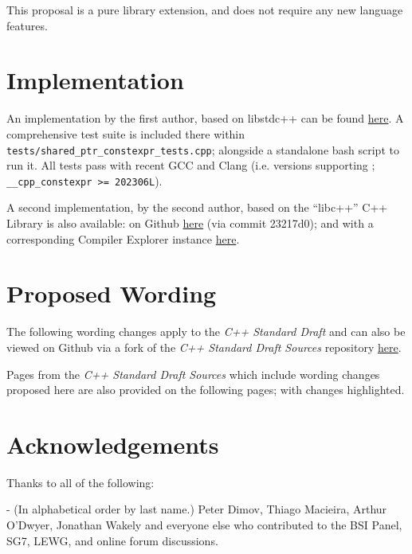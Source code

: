 \documentclass[10pt]{article}
\newcommand*{\upstreamcommit}{4dd513d}
\newcommand*{\forkcommit}{4b5d3cf}
\begin{document}
This proposal is a pure library extension, and does not require any new
language features.

\section{Implementation}

An implementation by the first author, based on libstdc++
can be found \href{https://github.com/SCT4SP/constexpr_shared_ptr}{here}. A
comprehensive test suite is included there within
\texttt{tests/shared\_ptr\_constexpr\_tests.cpp}; alongside a standalone bash
script to run it. All tests pass with recent GCC and Clang (i.e. versions
supporting \cite{P2738R1}; \texttt{\_\_cpp\_constexpr >= 202306L}).

A second implementation, by the second author, based on the ``libc++'' C++
Library is also available: on Github
\href{https://github.com/hanickadot/llvm-project/tree/P3309-constexpr-atomic-and-atomic-ref}{here}
(via commit 23217d0); and with a corresponding Compiler Explorer instance
\href{https://compiler-explorer.com/z/8cj7nc1no}{here}.

\section{Proposed Wording}
\label{sec:wording}

The following wording changes apply to the \emph{C++ Standard Draft} and can
also be viewed on Github via a fork of the \emph{C++ Standard Draft Sources}
repository
\href{https://github.com/cplusplus/draft/compare/\upstreamcommit...pkeir:draft:\forkcommit}{here}.

Pages from the \emph{C++ Standard Draft Sources} which include wording changes
proposed here are also provided on the following pages; with changes
highlighted.



\section{Acknowledgements}

Thanks to all of the following:

  - (In alphabetical order by last name.) Peter Dimov, Thiago Macieira, Arthur O'Dwyer, Jonathan Wakely and everyone else who contributed to the BSI Panel, SG7, LEWG, and online forum discussions.
\end{document}
